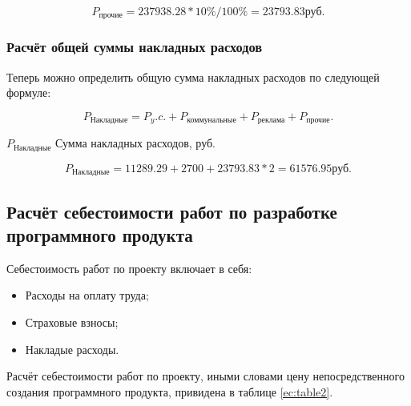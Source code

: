 \begin{equation*}
    P_\text{прочие} =  237938.28 * 10\% / 100\% = 23793.83 \text{руб}.
\end{equation*}

\subsubsection{Расчёт общей суммы накладных расходов}

Теперь можно определить общую сумма накладных расходов по следующей формуле:

\begin{equation}
    P_\text{Накладные} = P_y.c. + P_\text{коммунальные} + P_\text{реклама} + P_\text{прочие}.
\end{equation}

\begin{eqexpl}[25mm]
    \item{$P_\text{Накладные}$} Сумма накладных расходов, руб.
\end{eqexpl}

\begin{equation*}
    P_\text{Накладные} = 11289.29 + 2700 + 23793.83 * 2 = 61576.95 \text{руб.}
\end{equation*}

\subsection{Расчёт себестоимости работ по разработке программного продукта}

Себестоимость работ по проекту включает в себя:

\begin{itemize}
    \item Расходы на оплату труда;
    \item Страховые взносы;
    \item Накладые расходы.
\end{itemize}

Расчёт себестоимости работ по проекту, иными словами цену непосредственного создания
программного продукта, привидена в таблице \ref{ec:table2}.

\tabcolsep=0.5cm

